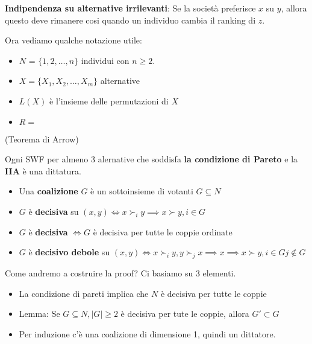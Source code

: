 \textbf{Indipendenza su alternative irrilevanti}: Se la società preferisce $x$ su $y$, allora questo deve rimanere cosi quando un individuo cambia il ranking di $z$.

Ora vediamo qualche notazione utile:

\begin{itemize}
    \item $N$ = $\{1,2,\dots, n\}$ individui con $n \geq 2$.
    \item $X = \{X_1, X_2, \dots, X_m\}$ alternative 
    \item $L(X)$ è l'insieme delle permutazioni di $X$
    \item $R = $
\end{itemize}

\begin{definition}
    (Teorema di Arrow)

    Ogni SWF per almeno 3 alernative che soddisfa \textbf{la condizione di Pareto} e la \textbf{IIA} è una dittatura.

    \begin{itemize}
        \item Una \textbf{coalizione} $G$ è un sottoinsieme di votanti $G \subseteq N$
        \item $G$ è \textbf{decisiva} su $(x,y) \iff x \succ_i y \implies x \succ y, i \in G$
        \item $G$ è \textbf{decisiva} $\iff G$ è decisiva per tutte le coppie ordinate 
        \item $G$ è \textbf{decisivo debole} su $(x,y) \iff x \succ _i y, y \succ_j x  \implies x \implies x \succ y, i \in G j \notin G$
    \end{itemize}
\end{definition} 

Come andremo a costruire la proof? Ci basiamo su 3 elementi.

\begin{itemize}
    \item La condizione di pareti implica che $N$ è decisiva per tutte le coppie
    \item Lemma: Se $G \subseteq N, |G| \geq 2$ è decisiva per tute le coppie, allora $G' \subset G$
    \item Per induzione c'è una coalizione di dimensione 1, quindi un dittatore.
\end{itemize}

